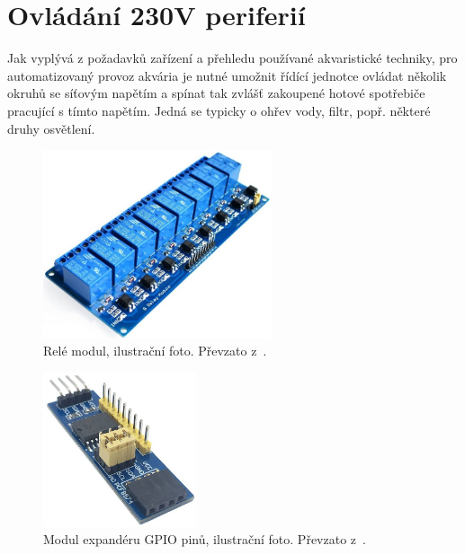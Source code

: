 \section{Ovládání 230V periferií}

Jak vyplývá z požadavků zařízení a přehledu používané akvaristické techniky, pro automatizovaný provoz akvária je nutné umožnit řídící jednotce ovládat několik okruhů se síťovým napětím a spínat tak zvlášť zakoupené hotové spotřebiče pracující s tímto napětím. Jedná se typicky o ohřev vody, filtr, popř. některé druhy osvětlení. 

\begin{figure}[h!]
    \centering
    \includegraphics[width=0.6\textwidth]{obrazky/230/rele.jpg}
    \caption{Relé modul, ilustrační foto. Převzato z~\cite{eshop-laskakit-rele}.}
    \label{fig:obrazky-230-rele-jpg}
\end{figure}

\begin{figure}[h!]
    \centering
    \includegraphics[width=0.4\textwidth]{obrazky/230/expander.jpg}
    \caption{Modul expandéru GPIO pinů, ilustrační foto. Převzato z~\cite{eshop-laskakit-expander}.}
    \label{fig:obrazky-230-expander-jpg}
\end{figure}

